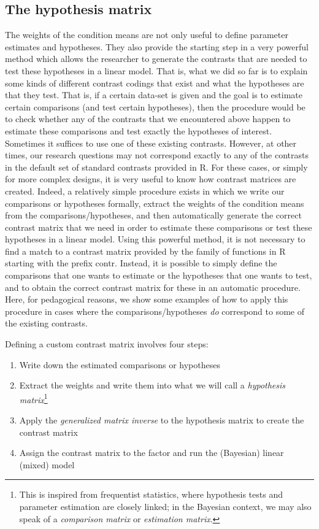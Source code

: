 \documentclass[12pt,]{krantz}
\providecommand{\tightlist}{%
  \setlength{\itemsep}{0pt}\setlength{\parskip}{0pt}}
\theoremstyle{definition}
\theoremstyle{definition}
\theoremstyle{definition}
\theoremstyle{remark}
\begin{document}
\subsection{The hypothesis matrix}\label{the-hypothesis-matrix}

The weights of the condition means are not only useful to define
parameter estimates and hypotheses. They also provide the starting step
in a very powerful method which allows the researcher to generate the
contrasts that are needed to test these hypotheses in a linear model.
That is, what we did so far is to explain some kinds of different
contrast codings that exist and what the hypotheses are that they test.
That is, if a certain data-set is given and the goal is to estimate
certain comparisons (and test certain hypotheses), then the procedure
would be to check whether any of the contrasts that we encountered above
happen to estimate these comparisons and test exactly the hypotheses of
interest. Sometimes it suffices to use one of these existing contrasts.
However, at other times, our research questions may not correspond
exactly to any of the contrasts in the default set of standard contrasts
provided in R. For these cases, or simply for more complex designs, it
is very useful to know how contrast matrices are created. Indeed, a
relatively simple procedure exists in which we write our comparisons or
hypotheses formally, extract the weights of the condition means from the
comparisons/hypotheses, and then automatically generate the correct
contrast matrix that we need in order to estimate these comparisons or
test these hypotheses in a linear model. Using this powerful method, it
is not necessary to find a match to a contrast matrix provided by the
family of functions in R starting with the prefix contr. Instead, it is
possible to simply define the comparisons that one wants to estimate or
the hypotheses that one wants to test, and to obtain the correct
contrast matrix for these in an automatic procedure. Here, for
pedagogical reasons, we show some examples of how to apply this
procedure in cases where the comparisons/hypotheses \emph{do} correspond
to some of the existing contrasts.

Defining a custom contrast matrix involves four steps:

\begin{enumerate}
\def\labelenumi{\arabic{enumi}.}
\tightlist
\item
  Write down the estimated comparisons or hypotheses
\item
  Extract the weights and write them into what we will call a
  \emph{hypothesis matrix}\footnote{This is inspired from frequentist
    statistics, where hypothesis tests and parameter estimation are
    closely linked; in the Bayesian context, we may also speak of a
    \emph{comparison matrix} or \emph{estimation matrix}.}
\item
  Apply the \emph{generalized matrix inverse} to the hypothesis matrix
  to create the contrast matrix
\item
  Assign the contrast matrix to the factor and run the (Bayesian) linear
  (mixed) model
\end{enumerate}
\end{document}
